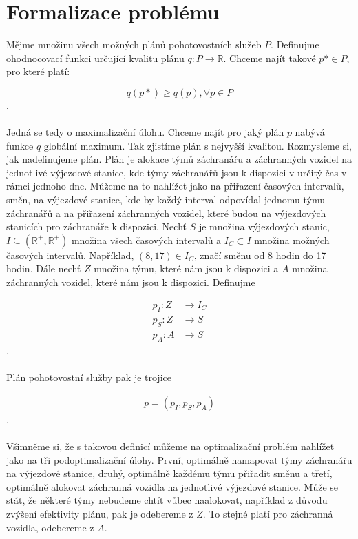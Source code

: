 \clearpage

\section{Formalizace problému}

Mějme množinu všech možných plánů pohotovostních služeb $P$. Definujme ohodnocovací funkci určující kvalitu plánu $q\colon P \rightarrow \mathbb{R}$.
Chceme najít takové $p* \in P$, pro které platí:

$$
q(p*) \geq q(p), \forall p \in P
$$
.
\\
\\
Jedná se tedy o maximalizační úlohu. Chceme najít pro jaký plán $p$ nabývá funkce $q$ globální maximum. Tak zjistíme plán s nejvyšší kvalitou.
Rozmysleme si, jak nadefinujeme plán. Plán je alokace týmů záchranářu a záchranných vozidel na jednotlivé výjezdové stanice, kde týmy záchranářů jsou k dispozici v určitý čas v rámci jednoho dne.
Můžeme na to nahlížet jako na přiřazení časových intervalů, směn, na výjezdové stanice, kde by každý interval odpovídal jednomu týmu záchranářů a na přiřazení záchranných vozidel,
které budou na výjezdových stanicích pro záchranáře k dispozici.
Nechť $S$ je množina výjezdových stanic, $I \subseteq (\mathbb{R^+}, \mathbb{R^+})$ množina všech časových intervalů a $I_C \subset I$ množina možných časových intervalů.
Například, $(8, 17) \in I_C$, značí směnu od 8 hodin do 17 hodin.
Dále nechť $Z$ množina týmu, které nám jsou k dispozici a $A$ množina záchranných vozidel, které nám jsou k dispozici. Definujme

\begin{align}
p_I \colon Z &\rightarrow I_C \\
p_S \colon Z &\rightarrow S \\
p_A \colon A &\rightarrow S 
\end{align}
.
\\
\\
Plán pohotovostní služby pak je trojice

\begin{align}
p = (p_I, p_S, p_A)
\end{align}
.
\\
\\
Všimněme si, že s takovou definicí můžeme na optimalizační problém nahlížet jako na tři podoptimalizační úlohy.
První, optimálně namapovat týmy záchranářu na výjezdové stanice, druhý, optimálně každému týmu přiřadit směnu a třetí, optimálně alokovat záchranná vozidla na jednotlivé výjezdové stanice.
Může se stát, že některé týmy nebudeme chtít vůbec naalokovat, například z důvodu zvýšení efektivity plánu, pak je odebereme z $Z$. To stejné platí pro záchranná vozidla, odebereme z $A$.

